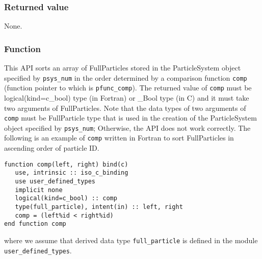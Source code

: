 \subsubsection*{Returned value}
None.

\subsubsection*{Function}
This API sorts an array of FullParticles stored in the ParticleSystem object specified by \texttt{psys\_num} in the order determined by a comparison function \texttt{comp} (function pointer to which is \texttt{pfunc\_comp}). The returned value of \texttt{comp} must be logical(kind=c\_bool) type {\small (in Fortran)} or \_Bool type {\small (in C)} and it must take two arguments of FullParticles. Note that the data types of two arguments of \texttt{comp} must be FullParticle type that is used in the creation of the ParticleSystem object specified by \texttt{psys\_num}; Otherwise, the API does not work correctly. The following is an example of \texttt{comp} written in Fortran to sort FullParticles in ascending order of particle ID.
\begin{lstlisting}[caption=An example of comparison function (Fortran)]
function comp(left, right) bind(c)
   use, intrinsic :: iso_c_binding
   use user_defined_types
   implicit none
   logical(kind=c_bool) :: comp
   type(full_particle), intent(in) :: left, right
   comp = (left%id < right%id)
end function comp
\end{lstlisting}
where we assume that derived data type \texttt{full\_particle} is defined in the module \texttt{user\_defined\_types}.
